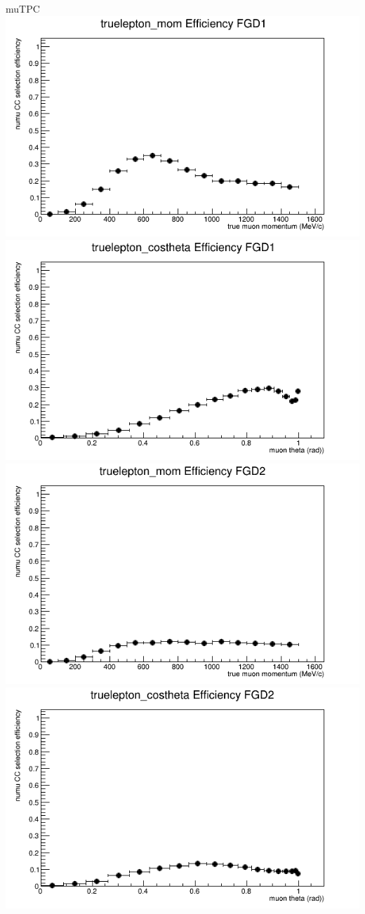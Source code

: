 \documentclass{beamer}
\begin{document}
\begin{frame}{muTPC}
\center
\includegraphics[width=.45\textwidth]{images/Eff_truelepton_mom_topology_muTPC_accum_level[][0][07]_data_mc.png}
\includegraphics[width=.45\textwidth]{images/Eff_truelepton_costheta_topology_muTPC_accum_level[][0][07]_data_mc.png}
\includegraphics[width=.45\textwidth]{images/Eff_truelepton_mom_fgd2topology_muTPC_accum_level[][1][07]_data_mc.png}
\includegraphics[width=.45\textwidth]{images/Eff_truelepton_costheta_fgd2topology_muTPC_accum_level[][1][07]_data_mc.png}
\end{frame}
\end{document}
